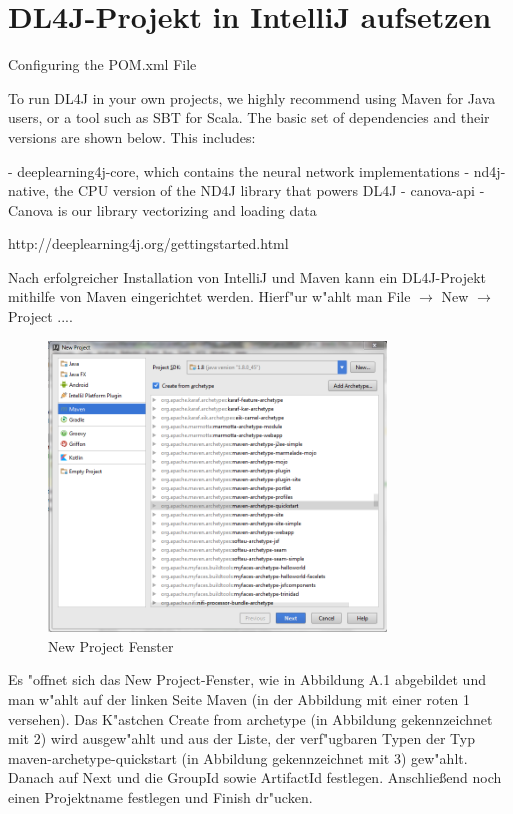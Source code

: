 \chapter{DL4J-Projekt in IntelliJ aufsetzen}
{

Configuring the POM.xml File

To run DL4J in your own projects, we highly recommend using Maven for Java users, or a tool such as SBT for Scala. The basic set of dependencies and their versions are shown below. This includes:

   -  deeplearning4j-core, which contains the neural network implementations
   -  nd4j-native, the CPU version of the ND4J library that powers DL4J
    - canova-api - Canova is our library vectorizing and loading data

http://deeplearning4j.org/gettingstarted.html


Nach erfolgreicher Installation von IntelliJ und Maven kann ein DL4J-Projekt mithilfe von Maven eingerichtet werden. Hierf"ur w"ahlt man \glqq File\grqq{} $\rightarrow$ \glqq New\grqq{} $\rightarrow$ \glqq Project ...\grqq . 
\renewcommand{\figurename}{Abb.}
\begin{figure}[htp]
\centering
\includegraphics[width=0.80\textwidth]{pictures/mavenProj.png}
\caption[\glqq New Project\grqq{} Fenster]{\glqq New Project\grqq{} Fenster}
\end{figure}
Es "offnet sich das \glqq New Project\grqq -Fenster, wie in Abbildung A.1 abgebildet und man w"ahlt auf der linken Seite \glqq Maven\grqq{} (in der Abbildung mit einer roten 1 versehen). Das K"astchen \glqq Create from archetype\grqq{} (in Abbildung gekennzeichnet mit 2) wird ausgew"ahlt und aus der Liste, der verf"ugbaren Typen der Typ \glqq maven-archetype-quickstart\grqq{} (in Abbildung gekennzeichnet mit 3) gew"ahlt. Danach auf \glqq Next\grqq{}  und die GroupId sowie ArtifactId festlegen. Anschlie{\ss}end noch einen Projektname festlegen und \glqq Finish\grqq{} dr"ucken.


}
